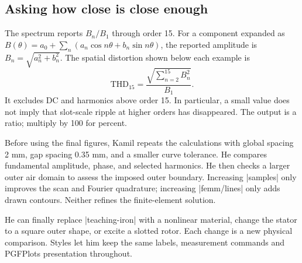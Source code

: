 
\begin{codeexample}[width=5.2cm]
\begin{tikzpicture}
\begin{axis}[width=9cm,height=4.2cm,ybar,bar width=4pt,
    ymin=0,xmin=.5,xmax=15.5,xtick={1,3,...,15},
    xlabel={Spatial harmonic order},ylabel={$B_n/B_1$}]
  \femmharmonicplot[profile=kamil-positioned,
    maximum order=15,normalize=true]
\end{axis}
\end{tikzpicture}
\end{codeexample}


\subsection{Asking how close is close enough}

The spectrum reports $B_n/B_1$ through order 15. For a component expanded as
$B(\theta)=a_0+\sum_n(a_n\cos n\theta+b_n\sin n\theta)$, the reported amplitude
is $B_n=\sqrt{a_n^2+b_n^2}$. The spatial distortion shown below each example is
\[
 \mathrm{THD}_{15}=\frac{\sqrt{\sum_{n=2}^{15}B_n^2}}{B_1}.
\]
It excludes DC and harmonics above order 15. In particular, a small value
does not imply that slot-scale ripple at higher orders has disappeared.
The output is a ratio; multiply by 100 for percent.

Before using the final figures, Kamil repeats the calculations with global
spacing 2 mm, gap spacing 0.35 mm, and a smaller curve tolerance. He compares
fundamental amplitude, phase, and selected harmonics. He then checks a larger
outer air domain to assess the imposed outer boundary. Increasing |samples|
only improves the scan and Fourier quadrature; increasing |femm/lines| only
adds drawn contours. Neither refines the finite-element solution.

He can finally replace |teaching-iron| with a nonlinear material, change the
stator to a square outer shape, or excite a slotted rotor. Each change is a
new physical comparison. Styles let him keep the same labels, measurement
commands and PGFPlots presentation throughout.
